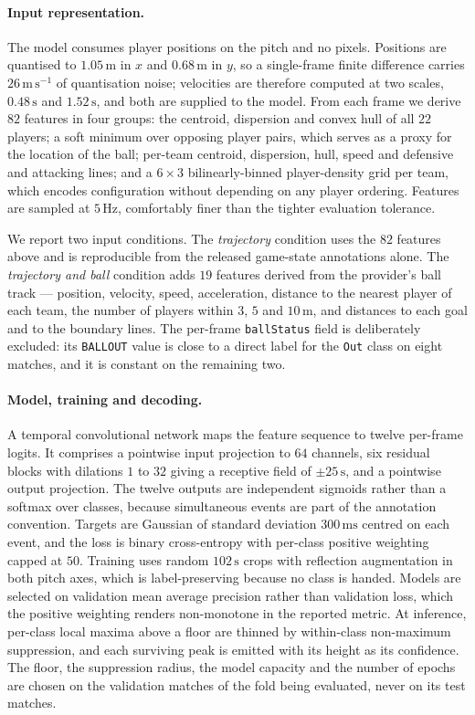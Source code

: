 \paragraph{Input representation.}
The model consumes player positions on the pitch and no pixels. Positions are quantised to
$1.05\,\text{m}$ in $x$ and $0.68\,\text{m}$ in $y$, so a single-frame finite difference
carries $26\,\text{m}\,\text{s}^{-1}$ of quantisation noise; velocities are therefore computed
at two scales, $0.48\,\text{s}$ and $1.52\,\text{s}$, and both are supplied to the model. From
each frame we derive $82$ features in four groups: the centroid, dispersion and convex hull of
all $22$ players; a soft minimum over opposing player pairs, which serves as a proxy for the
location of the ball; per-team centroid, dispersion, hull, speed and defensive and attacking
lines; and a $6 \times 3$ bilinearly-binned player-density grid per team, which encodes
configuration without depending on any player ordering. Features are sampled at $5\,\text{Hz}$,
comfortably finer than the tighter evaluation tolerance.

We report two input conditions. The \emph{trajectory} condition uses the $82$ features above
and is reproducible from the released game-state annotations alone. The \emph{trajectory and
ball} condition adds $19$ features derived from the provider's ball track --- position,
velocity, speed, acceleration, distance to the nearest player of each team, the number of
players within $3$, $5$ and $10\,\text{m}$, and distances to each goal and to the boundary
lines. The per-frame \texttt{ballStatus} field is deliberately excluded: its \texttt{BALLOUT}
value is close to a direct label for the \texttt{Out} class on eight matches, and it is
constant on the remaining two.

\paragraph{Model, training and decoding.}
A temporal convolutional network maps the feature sequence to twelve per-frame logits. It
comprises a pointwise input projection to $64$ channels, six residual blocks with dilations
$1$ to $32$ giving a receptive field of $\pm 25\,\text{s}$, and a pointwise output projection.
The twelve outputs are independent sigmoids rather than a softmax over classes, because
simultaneous events are part of the annotation convention. Targets are Gaussian of standard
deviation $300\,\text{ms}$ centred on each event, and the loss is binary cross-entropy with
per-class positive weighting capped at $50$. Training uses random $102\,\text{s}$ crops with
reflection augmentation in both pitch axes, which is label-preserving because no class is
handed. Models are selected on validation mean average precision rather than validation loss,
which the positive weighting renders non-monotone in the reported metric. At inference,
per-class local maxima above a floor are thinned by within-class non-maximum suppression, and
each surviving peak is emitted with its height as its confidence. The floor, the suppression
radius, the model capacity and the number of epochs are chosen on the validation matches of
the fold being evaluated, never on its test matches.


